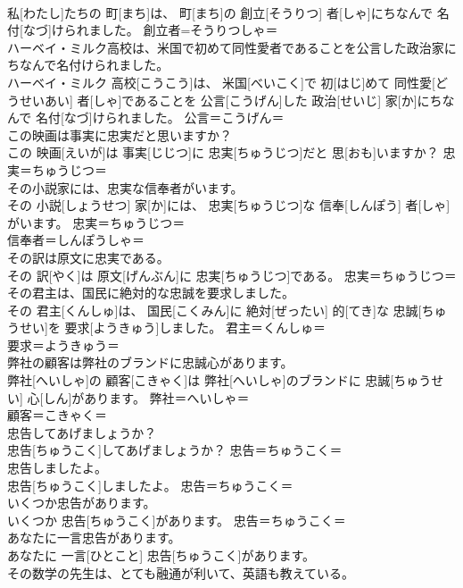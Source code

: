 \documentclass[8pt]{extreport}
\begin{document}
\begin{CJK}{UTF8}{min}
\\	私[わたし]たちの 町[まち]は、 町[まち]の 創立[そうりつ] 者[しゃ]にちなんで 名付[なづ]けられました。	創立者=そうりつしゃ＝ 
\\	ハーベイ・ミルク高校は、米国で初めて同性愛者であることを公言した政治家にちなんで名付けられました。	
\\	ハーベイ・ミルク 高校[こうこう]は、 米国[べいこく]で 初[はじ]めて 同性愛[どうせいあい] 者[しゃ]であることを 公言[こうげん]した 政治[せいじ] 家[か]にちなんで 名付[なづ]けられました。	公言＝こうげん＝ 
\\	この映画は事実に忠実だと思いますか？	
\\	この 映画[えいが]は 事実[じじつ]に 忠実[ちゅうじつ]だと 思[おも]いますか？	忠実＝ちゅうじつ＝ 
\\	その小説家には、忠実な信奉者がいます。	
\\	その 小説[しょうせつ] 家[か]には、 忠実[ちゅうじつ]な 信奉[しんぽう] 者[しゃ]がいます。	忠実＝ちゅうじつ＝ 
\\	信奉者＝しんぽうしゃ＝ 
\\	その訳は原文に忠実である。	
\\	その 訳[やく]は 原文[げんぶん]に 忠実[ちゅうじつ]である。	忠実＝ちゅうじつ＝ 
\\	その君主は、国民に絶対的な忠誠を要求しました。	
\\	その 君主[くんしゅ]は、 国民[こくみん]に 絶対[ぜったい] 的[てき]な 忠誠[ちゅうせい]を 要求[ようきゅう]しました。	君主＝くんしゅ＝ 
\\	要求＝ようきゅう＝ 
\\	弊社の顧客は弊社のブランドに忠誠心があります。	
\\	弊社[へいしゃ]の 顧客[こきゃく]は 弊社[へいしゃ]のブランドに 忠誠[ちゅうせい] 心[しん]があります。	弊社＝へいしゃ＝ 
\\	顧客＝こきゃく＝ 
\\	忠告してあげましょうか？	
\\	忠告[ちゅうこく]してあげましょうか？	忠告＝ちゅうこく＝ 
\\	忠告しましたよ。	
\\	忠告[ちゅうこく]しましたよ。	忠告＝ちゅうこく＝ 
\\	いくつか忠告があります。	
\\	いくつか 忠告[ちゅうこく]があります。	忠告＝ちゅうこく＝ 
\\	あなたに一言忠告があります。	
\\	あなたに 一言[ひとこと] 忠告[ちゅうこく]があります。	
\\	その数学の先生は、とても融通が利いて、英語も教えている。	

\end{CJK}
\end{document}
